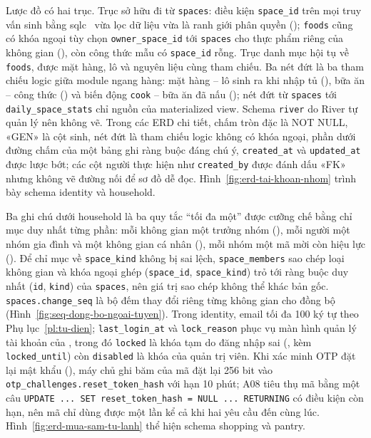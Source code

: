 Lược đồ có hai trục. Trục sở hữu đi từ \texttt{spaces}: điều kiện \texttt{space\_id} trên mọi truy vấn sinh bằng sqlc~\cite{sqlc} vừa lọc dữ liệu vừa là ranh giới phân quyền (); \texttt{foods} cũng có khóa ngoại tùy chọn \texttt{owner\_space\_id} tới \texttt{spaces} cho thực phẩm riêng của không gian (), còn công thức mẫu có \texttt{space\_id} rỗng. Trục danh mục hội tụ về \texttt{foods}, được mặt hàng, lô và nguyên liệu cùng tham chiếu. Ba nét đứt là ba tham chiếu logic giữa module ngang hàng: mặt hàng -- lô sinh ra khi nhập tủ (), bữa ăn -- công thức () và biến động \texttt{cook} -- bữa ăn đã nấu (); nét đứt từ \texttt{spaces} tới \texttt{daily\_space\_stats} chỉ nguồn của materialized view. Schema \texttt{river} do River tự quản lý nên không vẽ. Trong các ERD chi tiết, chấm tròn đặc là NOT NULL, «GEN» là cột sinh, nét đứt là tham chiếu logic không có khóa ngoại, phần dưới đường chấm của một bảng ghi ràng buộc đáng chú ý, \texttt{created\_at} và \texttt{updated\_at} được lược bớt; các cột người thực hiện như \texttt{created\_by} được đánh dấu «FK» nhưng không vẽ đường nối để sơ đồ dễ đọc. Hình~\ref{fig:erd-tai-khoan-nhom} trình bày schema identity và household.


Ba ghi chú dưới household là ba quy tắc “tối đa một” được cưỡng chế bằng chỉ mục duy nhất từng phần: mỗi không gian một trưởng nhóm (), mỗi người một nhóm gia đình và một không gian cá nhân (), mỗi nhóm một mã mời còn hiệu lực (). Để chỉ mục về \texttt{space\_kind} không bị sai lệch, \texttt{space\_members} sao chép loại không gian và khóa ngoại ghép (\texttt{space\_id}, \texttt{space\_kind}) trỏ tới ràng buộc duy nhất (\texttt{id}, \texttt{kind}) của \texttt{spaces}, nên giá trị sao chép không thể khác bản gốc. \texttt{spaces.change\_seq} là bộ đếm thay đổi riêng từng không gian cho đồng bộ (Hình~\ref{fig:seq-dong-bo-ngoai-tuyen}). Trong identity, email tối đa 100 ký tự theo Phụ lục~\ref{pl:tu-dien}; \texttt{last\_login\_at} và \texttt{lock\_reason} phục vụ màn hình quản lý tài khoản của , trong đó \texttt{locked} là khóa tạm do đăng nhập sai (, kèm \texttt{locked\_until}) còn \texttt{disabled} là khóa của quản trị viên. Khi xác minh OTP đặt lại mật khẩu (), máy chủ ghi băm của mã đặt lại 256 bit vào \texttt{otp\_challenges.reset\_token\_hash} với hạn 10 phút; A08 tiêu thụ mã bằng một câu \texttt{UPDATE ... SET reset\_token\_hash = NULL ... RETURNING} có điều kiện còn hạn, nên mã chỉ dùng được một lần kể cả khi hai yêu cầu đến cùng lúc. Hình~\ref{fig:erd-mua-sam-tu-lanh} thể hiện schema shopping và pantry.

